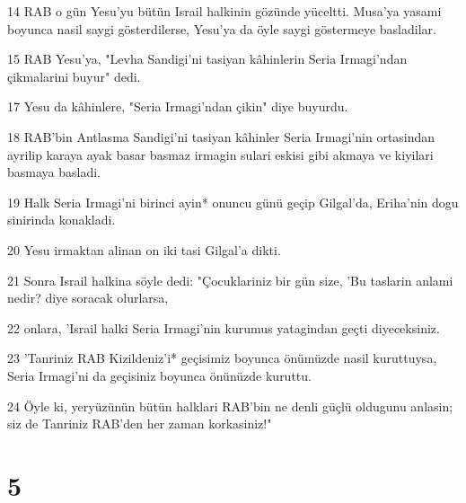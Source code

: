 \par 14 RAB o gün Yesu'yu bütün Israil halkinin gözünde yüceltti. Musa'ya yasami boyunca nasil saygi gösterdilerse, Yesu'ya da öyle saygi göstermeye basladilar.
\par 15 RAB Yesu'ya, "Levha Sandigi'ni tasiyan kâhinlerin Seria Irmagi'ndan çikmalarini buyur" dedi.
\par 17 Yesu da kâhinlere, "Seria Irmagi'ndan çikin" diye buyurdu.
\par 18 RAB'bin Antlasma Sandigi'ni tasiyan kâhinler Seria Irmagi'nin ortasindan ayrilip karaya ayak basar basmaz irmagin sulari eskisi gibi akmaya ve kiyilari basmaya basladi.
\par 19 Halk Seria Irmagi'ni birinci ayin* onuncu günü geçip Gilgal'da, Eriha'nin dogu sinirinda konakladi.
\par 20 Yesu irmaktan alinan on iki tasi Gilgal'a dikti.
\par 21 Sonra Israil halkina söyle dedi: "Çocuklariniz bir gün size, 'Bu taslarin anlami nedir? diye soracak olurlarsa,
\par 22 onlara, 'Israil halki Seria Irmagi'nin kurumus yatagindan geçti diyeceksiniz.
\par 23 'Tanriniz RAB Kizildeniz'i* geçisimiz boyunca önümüzde nasil kuruttuysa, Seria Irmagi'ni da geçisiniz boyunca önünüzde kuruttu.
\par 24 Öyle ki, yeryüzünün bütün halklari RAB'bin ne denli güçlü oldugunu anlasin; siz de Tanriniz RAB'den her zaman korkasiniz!"

\chapter{5}

